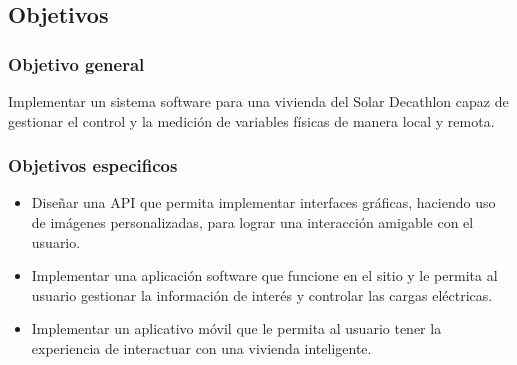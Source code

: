 \subsection{Objetivos}

\subsubsection{Objetivo general}
Implementar un sistema software para una vivienda del Solar Decathlon capaz de gestionar el control y la medición de variables físicas de manera local y remota.
\subsubsection{Objetivos especificos}
\begin{itemize}
	\item Diseñar una API que permita implementar interfaces gráficas, haciendo uso de imágenes personalizadas, para lograr una interacción amigable con el usuario.
	\item Implementar una aplicación software que funcione en el sitio y le permita al usuario gestionar la información de interés y controlar las cargas eléctricas.
	\item Implementar un aplicativo móvil que le permita al usuario tener la experiencia de interactuar con una vivienda inteligente.
\end{itemize}

